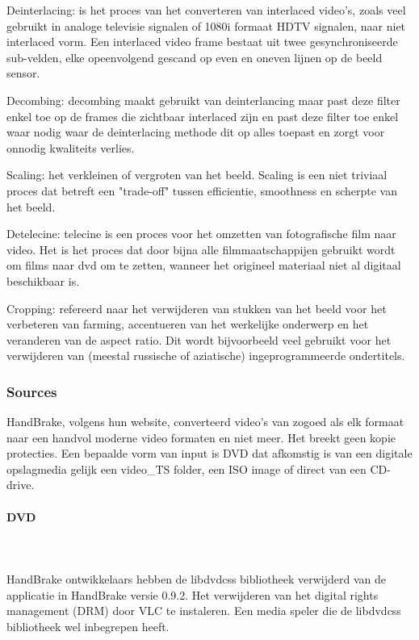 \begin{list}{*}{}
\item Deinterlacing: is het proces van het converteren van interlaced video's, zoals veel gebruikt in analoge televisie signalen of 1080i formaat HDTV signalen, naar niet interlaced vorm. Een interlaced video frame bestaat uit twee gesynchroniseerde sub-velden, elke opeenvolgend gescand op even en oneven lijnen op de beeld sensor\cite{Deinterlancing}.

\item Decombing: decombing maakt gebruikt van deinterlancing maar past deze filter enkel toe op de frames die zichtbaar interlaced zijn en past deze filter toe enkel waar nodig waar de deinterlacing methode dit op alles toepast en zorgt voor onnodig kwaliteits verlies\cite{Decomb}.

\item Scaling: het verkleinen of vergroten van het beeld. Scaling is een niet triviaal proces dat betreft een "trade-off" tussen efficientie, smoothness en scherpte van het beeld\cite{scaling}.

\item Detelecine: telecine is een proces voor het omzetten van fotografische film naar video. Het is het proces dat door bijna alle filmmaatschappijen gebruikt wordt om films naar dvd om te zetten, wanneer het origineel materiaal niet al digitaal beschikbaar is\cite{Telecine}.

\item Cropping: refereerd naar het verwijderen van stukken van het beeld voor het verbeteren van farming, accentueren van het werkelijke onderwerp en het veranderen van de aspect ratio. Dit wordt bijvoorbeeld veel gebruikt voor het verwijderen van (meestal russische of aziatische) ingeprogrammeerde ondertitels\cite{Cropping}.
\end{list}

\subsubsection{Sources}

HandBrake, volgens hun website, converteerd video's van zogoed als elk formaat naar een handvol moderne video formaten en niet meer. Het breekt geen kopie protecties. Een bepaalde vorm van input is DVD dat afkomstig is van een digitale opslagmedia gelijk een video\_TS folder, een ISO image of direct van een CD-drive.

\paragraph{DVD}
\ \\
\ \\
HandBrake ontwikkelaars hebben de libdvdcss\cite{Libdvdcss} bibliotheek verwijderd van de applicatie in HandBrake versie 0.9.2. Het verwijderen van het digital rights management (DRM)\cite{DRM} door VLC\cite{VLC} te instaleren. Een media speler die de libdvdcss bibliotheek wel inbegrepen heeft.

